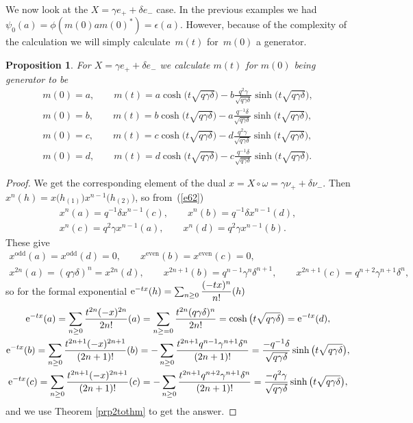 \documentclass[pdftex]{sigma}
\numberwithin{equation}{section}
\newtheorem{Proposition}[Theorem]{Proposition}
 { \theoremstyle{definition}
\newtheorem{Definition}[Theorem]{Definition}
\newtheorem{Note}[Theorem]{Note}
\newtheorem{Example}[Theorem]{Example}
\newtheorem{Remark}[Theorem]{Remark} }
\newcommand{\<}{\langle}
\renewcommand{\>}{\rangle}
\begin{document}
 We now look at the $ X=\gamma e_{+}+\delta e_{-} $ case. In the previous examples we had $ \psi_0(a) =\phi (m(0) a m(0)^{*}) \allowbreak =\epsilon(a)$. However, because of the complexity of the calculation we will simply calculate~$ m(t) $ for~$ m(0)$ a generator.
 \begin{Proposition} \label{P7}
 For $ X= \gamma e_{+} + \delta e_{-} $ we calculate $ m(t) $ for $ m (0) $ being generator to be
 \begin{gather*}
 		m(0)=a, \qquad m(t)=	a \cosh \big(t\sqrt{q \gamma \delta}\big)-b\frac{q^{2} \gamma}{\sqrt{q \gamma \delta}} \sinh \big(t\sqrt{q \gamma \delta}\big),\\
 	m(0)=b, \qquad m(t)= 	b\cosh \big(t\sqrt{q \gamma \delta}\big)-a\frac{q^{-1} \delta}{\sqrt{q \gamma \delta}} \sinh \big(t\sqrt{q \gamma \delta}\big),\\
 	m(0)=c, \qquad m(t)= c\cosh \big(t\sqrt{q \gamma \delta}\big)-d\frac{q^{2} \gamma}{\sqrt{q \gamma \delta}} \sinh \big(t\sqrt{q \gamma \delta}\big),\\
 	m(0)=d, \qquad m(t)= d\cosh \big(t\sqrt{q \gamma \delta}\big)-c\frac{q^{-1} \delta}{\sqrt{q \gamma \delta}} \sinh \big(t\sqrt{q \gamma \delta}\big).
 \end{gather*}
 \end{Proposition}
\begin{proof}
	We get the corresponding element of the dual $ x=X\circ \omega= \gamma \nu_{+} + \delta \nu_{-} $. Then $ x^{n}(h)=x\big(h_{(1)}\big) x^{n-1}\big(h_{(2)}\big) $, so from~(\ref{e62})
	\begin{gather*}
		x^{n}(a)=q^{-1} \delta x^{n-1}(c), \qquad 	x^{n}(b)=q^{-1} \delta x^{n-1}(d), \\ 	x^{n}(c)=q^{2} \gamma x^{n-1}(a), \qquad x^{n}(d)=q^{2} \gamma x^{n-1}(b).
	\end{gather*}
	These give
	\begin{gather*}
	x^{\text{odd}}(a)=	x^{\text{odd}}(d)=0, \qquad x^{\text{even}}(b)=	x^{\text{even}}(c)=0, \\
	x^{2n}(a)=(q \gamma \delta )^{n}=x^{2n}(d), \qquad
		x^{2n+1}(b)=q ^{n-1}\gamma^{n} \delta ^{n+1}, \qquad 	x^{2n+1}(c)=q ^{n+2}\gamma^{n+1} \delta ^{n},
	\end{gather*}
	so for the formal exponential $ {\rm e}^{-tx} (h)= \sum_{n\geq 0} \dfrac{(-tx)^{n}}{n!}(h)$
	\begin{gather*}
		{\rm e}^{-tx} (a)= \sum_{n\geq 0} \dfrac{t^{2n}(-x)^{2n}}{2n!}(a)= \sum_{n\geq =0} \dfrac{t^{2n}(q \gamma \delta)^{n}}{2n!}=\cosh \big(t\sqrt{q \gamma \delta}\big)={\rm e}^{-tx} (d),\\
		{\rm e}^{-tx} (b)= \sum_{n\geq 0} \dfrac{t^{2n+1}(-x)^{2n+1}}{(2n+1)!}(b)= -\sum_{n\geq 0} \dfrac{t^{2n+1} q^{n-1} \gamma ^{n+1}\delta^{n}}{(2n+1)!}=\frac{-q^{-1} \delta}{\sqrt{q \gamma \delta}}\sinh \big(t\sqrt{q \gamma \delta}\big),\\
		{\rm e}^{-tx} (c)= \sum_{n\geq 0} \dfrac{t^{2n+1}(-x)^{2n+1}}{(2n+1)!}(c)= -\sum_{n\geq 0} \dfrac{t^{2n+1} q^{n+2} \gamma ^{n+1}\delta^{n}}{(2n+1)!}=\frac{-q^{2} \gamma}{\sqrt{q \gamma \delta}}\sinh \big(t\sqrt{q \gamma \delta}\big),
	\end{gather*}
and we use Theorem \ref{prp2tothm} to get the answer.
\end{proof}
\end{document}
